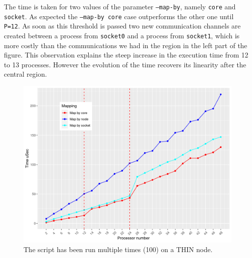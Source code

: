 \documentclass[11pt,a4paper]{article}
\begin{document}
The time is taken for two values of the parameter \texttt{--map-by}, namely \texttt{core} and \texttt{socket}. As expected the \texttt{--map-by core} case outperforms the other one until \texttt{P=12}. As soon as this threshold is passed two new communication channels are created between a process from \texttt{socket0} and a process from \texttt{socket1}, which is more costly than the communications we had in the region in the left part of the figure. This observation explains the steep increase in the execution time from 12 to 13 processes. However the evolution of the time recovers its linearity after the central region.
\begin{figure}[h!]
    \centering
    \includegraphics[width=\textwidth]{ring.png}
    \caption{The script has been run multiple times (100) on a THIN node.}
    \label{fig:ring_performance}
\end{figure}
\end{document}
